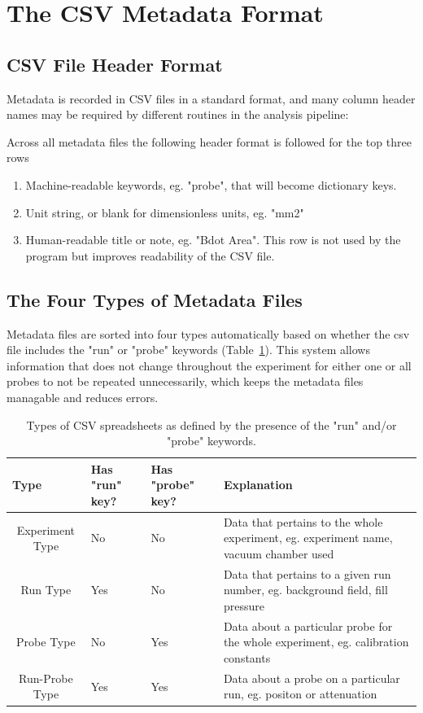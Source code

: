 \documentclass[12pt]{article}
\begin{document}
\section{The CSV Metadata Format\label{csv_format}}

\subsection{CSV File Header Format}

Metadata is recorded in CSV files in a standard format, and many column header names may be required by different routines in the analysis pipeline:

Across all metadata files the following header format is followed for the top three rows
\begin{enumerate}
\item Machine-readable keywords, eg. "probe", that will become dictionary keys.
\item Unit string, or blank for dimensionless units, eg. "mm2"
\item Human-readable title or note, eg. "Bdot Area". This row is not used by the program but improves readability of the CSV file.
\end{enumerate}

\subsection{The Four Types of Metadata Files}
Metadata files are sorted into four types automatically based on whether the csv file includes the "run" or "probe" keywords (Table~\ref{csv_types}). This system allows information that does not change throughout the experiment for either one or all probes to not be repeated unnecessarily, which keeps the metadata files managable and reduces errors.

\begin{table}[]
\begin{tabular}{p{1cm}p{2cm}p{2cm}p{6cm}}
Type                                 & Has "run" key? & Has "probe" key? & Explanation                                                                          \\ \hline
\multicolumn{1}{c|}{Experiment Type} & No             & No               & Data that pertains to the whole experiment, eg. experiment name, vacuum chamber used \\
\multicolumn{1}{c|}{Run Type}        & Yes            & No               & Data that pertains to a given run number, eg. background field, fill pressure        \\
\multicolumn{1}{c|}{Probe Type}      & No             & Yes              & Data about a particular probe for the whole experiment, eg. calibration constants    \\
\multicolumn{1}{c|}{Run-Probe Type}  & Yes            & Yes              & Data about a probe on a particular run, eg. positon or attenuation                  
\end{tabular}
\caption{Types of CSV spreadsheets as defined by the presence of the "run" and/or "probe" keywords.\label{csv_types}}
\end{table}
\end{document}

